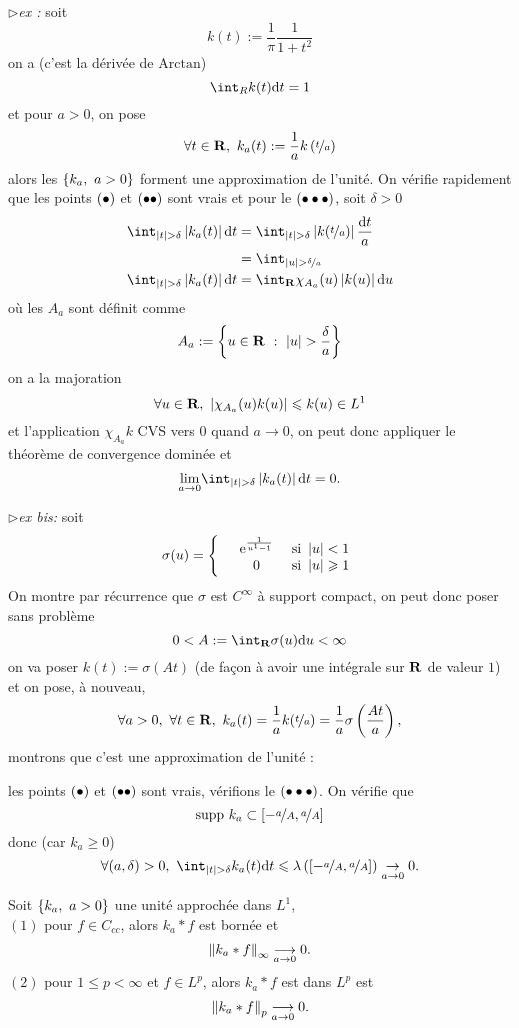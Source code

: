 \documentclass[a4paper,11pt, twoside]{article}
\begin{document}
$\triangleright$\emph{ex : }soit 
$$k(t):=\frac{1}{\pi}\frac{1}{1+t^2}$$
on a (c'est la dérivée de $\mathrm{Arctan}$) 
$$\int_R k(t)\dt=1$$
et pour $a>0$, on pose 
$$\forall t\in\R,\ k_a(t):=\frac{1}{a}k\Par{\nicefrac{t}{a}}$$
alors les $\left\{k_a,\ a>0\right\}$ forment une approximation de l'unité. On vérifie rapidement que les points $(\bullet)$ et $(\bullet\bullet)$ sont vrais et pour le $(\bullet\bullet\bullet)$, soit $\delta>0$
\begin{align*}
  \int_{\abs t>\delta}\abs{k_a(t)}\dt&=\int_{\abs t>\delta}\abs{k(\nicefrac{t}{a})}\frac{\dt}{a}\\
  &=\int_{\abs u>\nicefrac{\delta}{a}}\\
  \int_{\abs t>\delta}\abs{k_a(t)}\dt&=\int_\R\chi_{A_a}(u)\abs{k(u)}\mathrm du\\
\end{align*}
où les $A_a$ sont définit comme 
$$A_a:=\ens{u\in\R\ :\ \abs u>\frac{\delta}{a}}$$
on a la majoration 
$$\forall u\in\mathbf R,\ \left| \chi_{A_a}(u)k(u)\right|\leqslant k(u)\in L^1$$
et l'application $\chi_{A_a}k$ CVS vers $0$ quand $a\to 0$, on peut donc appliquer le théorème de convergence dominée et 
$$\underset{a\to 0}{\mathrm{lim}}\int_{\abs t>\delta}\abs{k_a(t)}\dt=0.$$


$\triangleright$\emph{ex bis: }soit
$$\sigma(u)=\left\{
\begin{array}{lcc}
  &\mathrm{e}^{\frac{1}{u^1-1}}&\text{ si }\left| u\right|<1\\
  &0&\text{ si }\left| u\right|\geqslant 1
\end{array}\right.$$
On montre par récurrence que $\sigma$ est $C^\infty$ à support compact, on peut donc poser sans problème
$$0<A:=\int_\R\sigma(u)\mathrm du<\infty$$
on va poser $k(t):=\sigma(At)$ (de façon à avoir une intégrale sur $\mathbf R$ de valeur $1$) et on pose, à nouveau, 
$$\forall a>0,\ \forall t\in\R,\ k_a(t)=\frac{1}{a}k(\nicefrac{t}{a})=\frac{1}{a}\sigma\Par{\frac{At}{a}},$$
montrons que c'est une approximation de l'unité :

les points $(\bullet)$ et $(\bullet\bullet)$ sont vrais, vérifions le $(\bullet\bullet\bullet)$. On vérifie que 
$$\mathrm{supp}\ k_a\subset \left[-\nicefrac{a}{A},\nicefrac{a}{A}\right]$$
donc (car $k_a\geqslant 0$)
$$\forall (a,\delta)>0,\ \int_{\abs t>\delta}k_a(t)\dt\leqslant \lambda\Par{\left[-\nicefrac{a}{A},\nicefrac{a}{A}\right]}\underset{a\to0}{\rightarrow}0.$$



\begin{prop}
  Soit $\left\{k_a,\ a>0\right\}$ une unité approchée dans $L^1$,\\

  $(\mathit 1)$ pour $f\in C_{cc}$, alors $k_a*f$ est bornée et 
  $$\left\lVert k_a*f\right\rVert_{\infty}\underset{a\to 0}{\longrightarrow}0.$$
  $(\mathit 2)$ pour $1\leqslant p<\infty$ et $f\in L^p$, alors $k_a*f$ est dans $L^p$ est 
  $$\left\lVert k_a*f\right\rVert_{p}\underset{a\to 0}{\longrightarrow}0.$$
\end{prop}
\end{document}
